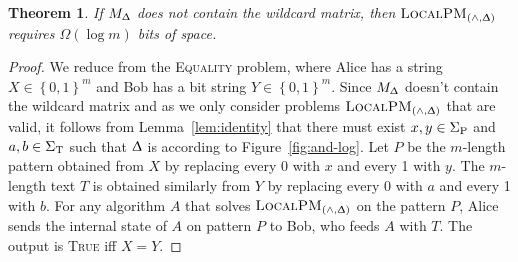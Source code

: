 \documentclass{article}
\renewcommand{\Delta}{\Updelta}
\newcommand{\TRUE}{\textsc{True}\xspace}
\newcommand{\equality}{\textsc{Equality}\xspace}
\newcommand{\SigmaP}{\ensuremath{\Sigma_{\textup{P}}}}
\newcommand{\SigmaT}{\ensuremath{\Sigma_{\textup{T}}}}
\newcommand{\local}{\ensuremath{\textsc{LocalPM}}}
\theoremstyle{plain}
\newtheorem{theorem}{Theorem}[]
\theoremstyle{definition}
\begin{document}
\begin{theorem}
    \label{thm:and-log}
    If $M_{\Delta}$ does not contain the wildcard matrix, then $\local_{(\wedge,\Delta)}$ requires $\Omega(\log m)$ bits of space.
\end{theorem}
\begin{proof}
    We reduce from the \equality problem, where Alice has a string $X\in\left\{ 0,1\right\} ^{m}$ and Bob has a bit string $Y\in\left\{ 0,1\right\} ^{m}$. Since $M_{\Delta}$ doesn't contain the wildcard matrix and as we only consider problems $\local_{(\wedge,\Delta)}$ that are valid, it follows from Lemma~\ref{lem:identity} that there must exist $x,y\in\SigmaP$ and $a,b\in\SigmaT$ such that $\Delta$ is according to Figure~\ref{fig:and-log}.
    Let $P$ be the $m$-length pattern obtained from $X$ by replacing every 0 with $x$ and every 1 with $y$. The $m$-length text $T$ is obtained similarly from $Y$ by replacing every 0 with $a$ and every 1 with $b$. For any algorithm $A$ that solves $\local_{(\wedge,\Delta)}$ on the pattern $P$, Alice sends the internal state of $A$ on pattern $P$ to Bob, who feeds $A$ with $T$. The output is \TRUE iff $X=Y$.
\end{proof}
\end{document}
